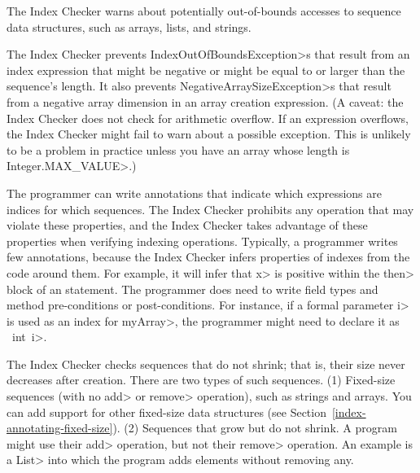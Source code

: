 \htmlhr
{}

The Index Checker warns about potentially out-of-bounds accesses to sequence
data structures, such as arrays, lists, and strings.

The Index Checker prevents \<IndexOutOfBoundsException>s that result from
an index expression that might be negative or might be equal to or larger
than the sequence's length.
It also prevents \<NegativeArraySizeException>s that result from a negative
array dimension in an array creation expression.
(A caveat: the Index Checker does not check for arithmetic overflow. If
an expression overflows, the Index Checker might fail to warn about a
possible exception.  This is unlikely to be a problem in practice unless
you have an array whose length is \<Integer.MAX\_VALUE>.)

%

The programmer can write annotations that indicate which expressions are
indices for which sequences.  The Index Checker prohibits any operation that
may violate these properties, and the Index Checker takes advantage of
these properties when verifying indexing operations.
%
Typically, a programmer writes few annotations, because the Index Checker
infers properties of indexes from
the code around them. For example, it will infer that \<x> is positive
within the \<then> block of an  statement.
The programmer does need to write field types and method pre-conditions or post-conditions. For instance,
if a formal parameter \<i> is used as an index for
\<myArray>, the programmer might need to declare it as
~\<int~i>.

The Index Checker checks sequences that do not shrink; that is, their
size never decreases after creation.  There are two types of such sequences.
(1) Fixed-size sequences (with no \<add> or
\<remove> operation), such as strings and arrays.
You can add
support for other fixed-size data structures (see
Section~\ref{index-annotating-fixed-size}).
(2) Sequences that grow but do not shrink.  A program might use their
\<add> operation, but not their \<remove> operation.  An example is a
\<List> into which the program adds elements without removing any.

